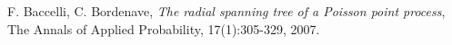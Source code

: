\documentclass[11pt, english, singlespacing, headsepline, ]{MastersDoctoralThesis}
\theoremstyle{definition}
\begin{document}



%
%
%

\begin{thebibliography}{90}

  F. Baccelli, C. Bordenave,
  \emph{The radial spanning tree of a Poisson point process},
  The Annals of Applied Probability, 17(1):305-329,
  2007.


\end{thebibliography}



\end{document}
